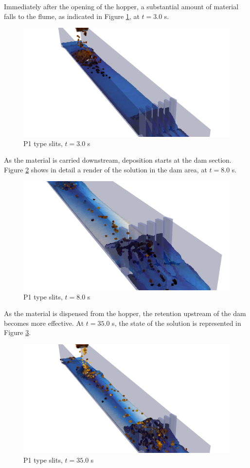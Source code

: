 Immediately after the opening of the hopper, a substantial amount of material falls to the flume, as indicated in Figure \ref{fig:t_2}, at $t=3.0$ s.
%
\begin{figure}[ht!]
	\centering
	\includegraphics[width=0.75\linewidth]{Figures/6.Chapter/frame_II}
	\caption{P1 type slits, $t=3.0$ s}
	\label{fig:t_2} 
\end{figure}
%

As the material is carried downstream, deposition starts at the dam section. Figure \ref{fig:t_35} shows in detail a render of the solution in the dam area, at $t=8.0$ s.
%
\begin{figure}[ht!]
	\centering
	\includegraphics[width=0.75\linewidth]{Figures/6.Chapter/frame_V}
	\caption{P1 type slits, $t=8.0$ s}
	\label{fig:t_35} 
\end{figure}
%

As the material is dispensed from the hopper, the retention upstream of the dam becomes more effective. At $t=35.0$ s, the state of the solution is represented in Figure \ref{fig:t_350}. 
%
\begin{figure}[ht!]
	\centering
	\includegraphics[width=0.75\linewidth]{Figures/6.Chapter/frame_III}
	\caption{P1 type slits, $t=35.0$ s}
	\label{fig:t_350} 
\end{figure}
%

